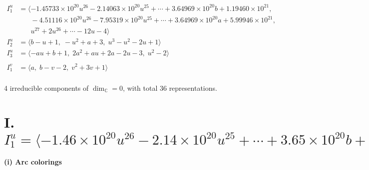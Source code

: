 \documentclass[1p]{elsarticle_modified}
\theoremstyle{definition}
\begin{document}
\begin{align*}
I^u_{1}&=\langle 
-1.45733\times10^{20} u^{26}-2.14063\times10^{20} u^{25}+\cdots+3.64969\times10^{20} b+1.19460\times10^{21},\\
\phantom{I^u_{1}}&\phantom{= \langle  }-4.51116\times10^{20} u^{26}-7.95319\times10^{20} u^{25}+\cdots+3.64969\times10^{20} a+5.99946\times10^{21},\\
\phantom{I^u_{1}}&\phantom{= \langle  }u^{27}+2 u^{26}+\cdots-12 u-4\rangle \\
I^u_{2}&=\langle 
b- u+1,\;- u^2+a+3,\;u^3- u^2-2 u+1\rangle \\
I^u_{3}&=\langle 
- a u+b+1,\;2 a^2+a u+2 a-2 u-3,\;u^2-2\rangle \\
\\
I^v_{1}&=\langle 
a,\;b- v-2,\;v^2+3 v+1\rangle \\
\end{align*}
\raggedright * 4 irreducible components of $\dim_{\mathbb{C}}=0$, with total 36 representations.\\
\newpage
\renewcommand{\arraystretch}{1}
\centering \section*{I. $I^u_{1}= \langle -1.46\times10^{20} u^{26}-2.14\times10^{20} u^{25}+\cdots+3.65\times10^{20} b+1.19\times10^{21},\;-4.51\times10^{20} u^{26}-7.95\times10^{20} u^{25}+\cdots+3.65\times10^{20} a+6.00\times10^{21},\;u^{27}+2 u^{26}+\cdots-12 u-4 \rangle$}
\flushleft \textbf{(i) Arc colorings}\\
\end{document}
